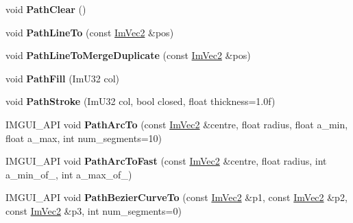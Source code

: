 \begin{DoxyCompactItemize}
\item 
\mbox{\label{struct_im_draw_list_ae9ad5f4d638b1bfd9383618dc60e3f18}} 
void {\bfseries Path\+Clear} ()
\item 
\mbox{\label{struct_im_draw_list_a828d944325ed58d8b57abd3647bffaaf}} 
void {\bfseries Path\+Line\+To} (const \mbox{\hyperlink{struct_im_vec2}{Im\+Vec2}} \&pos)
\item 
\mbox{\label{struct_im_draw_list_aa3dd11945fb62495f8b9e1392ed724e3}} 
void {\bfseries Path\+Line\+To\+Merge\+Duplicate} (const \mbox{\hyperlink{struct_im_vec2}{Im\+Vec2}} \&pos)
\item 
\mbox{\label{struct_im_draw_list_ac23cb368464d1c98230d1bf44e469c4f}} 
void {\bfseries Path\+Fill} (Im\+U32 col)
\item 
\mbox{\label{struct_im_draw_list_ac3172e376a4b77915bb22b6d8092b8b2}} 
void {\bfseries Path\+Stroke} (Im\+U32 col, bool closed, float thickness=1.\+0f)
\item 
\mbox{\label{struct_im_draw_list_a66744510ad42701992fecc009320e632}} 
I\+M\+G\+U\+I\+\_\+\+A\+PI void {\bfseries Path\+Arc\+To} (const \mbox{\hyperlink{struct_im_vec2}{Im\+Vec2}} \&centre, float radius, float a\+\_\+min, float a\+\_\+max, int num\+\_\+segments=10)
\item 
\mbox{\label{struct_im_draw_list_aa40b230336239ca99ae84657017c8ebb}} 
I\+M\+G\+U\+I\+\_\+\+A\+PI void {\bfseries Path\+Arc\+To\+Fast} (const \mbox{\hyperlink{struct_im_vec2}{Im\+Vec2}} \&centre, float radius, int a\+\_\+min\+\_\+of\+\_, int a\+\_\+max\+\_\+of\+\_)
\item 
\mbox{\label{struct_im_draw_list_a7534ffbc60761e2893444b6c11d83a28}} 
I\+M\+G\+U\+I\+\_\+\+A\+PI void {\bfseries Path\+Bezier\+Curve\+To} (const \mbox{\hyperlink{struct_im_vec2}{Im\+Vec2}} \&p1, const \mbox{\hyperlink{struct_im_vec2}{Im\+Vec2}} \&p2, const \mbox{\hyperlink{struct_im_vec2}{Im\+Vec2}} \&p3, int num\+\_\+segments=0)
\item 
\mbox{\label{struct_im_draw_list_a876f4d327502bebec04d4cfbc9d1fc13}} 

\end{DoxyCompactItemize}
